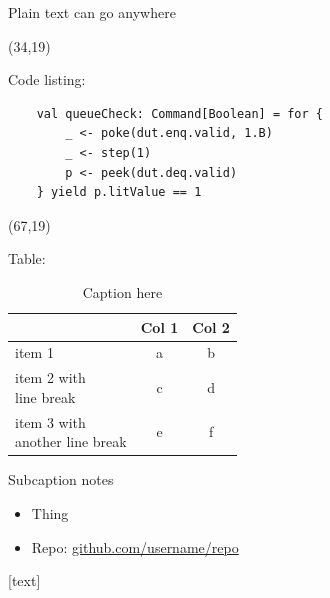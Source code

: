 \documentclass[final]{beamer}
\begin{document}
\begin{frame}{}
\begin{textblock}{32}
    Plain text can go anywhere
  \end{textblock}

  \begin{textblock}{32}(34,19)
    \vspace{0.5cm}

    Code listing:

    \begin{verbatim}
    val queueCheck: Command[Boolean] = for {
        _ <- poke(dut.enq.valid, 1.B)
        _ <- step(1)
        p <- peek(dut.deq.valid)
    } yield p.litValue == 1
    \end{verbatim}
  \end{textblock}

  \begin{textblock}{31}(67,19)
    \vspace{0.5cm}

    Table:

    \begin{center}
    \begin{table}[b]
      \small
      \begin{tabular}{lcc}
        \toprule
        & Col 1 & Col 2 \\ \midrule
        item 1 & a & b \\ \midrule
        \makecell[l]{item 2 with \\ line break} & c & d \\ \midrule
        \makecell[l]{item 3 with \\ another line break} & e & f \\
        \bottomrule
      \end{tabular}
      \caption*{Caption here}
      {\footnotesize Subcaption notes}
      \label{tab}
    \end{table}
    \end{center}

    \vspace{0.5cm}
    \vspace{0.5cm}

    \begin{itemize}
      \setlength\itemsep{0.5em}
      \item Thing
      \item Repo: {\small \url{github.com/username/repo}}
    \end{itemize}

    \vspace{0.5cm}
    \renewcommand*{\bibfont}{\scriptsize}
    [text]
    \printbibliography
  \end{textblock}
\end{frame}
\end{document}
